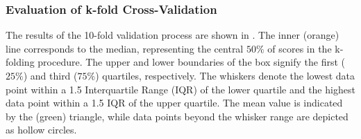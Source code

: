 \subsubsection{Evaluation of k-fold Cross-Validation}\label{sec:bbm_kfold_perf_eval}

The results of the 10-fold validation process are shown in . The inner (orange) line corresponds to the median, representing the central $50\%$ of scores in the k-folding procedure. The upper and lower boundaries of the box signify the first ($25\%$) and third ($75\%$) quartiles, respectively. The whiskers denote the lowest data point within a 1.5 Interquartile Range (IQR) of the lower quartile and the highest data point within a 1.5 IQR of the upper quartile. The mean value is indicated by the (green) triangle, while data points beyond the whisker range are depicted as hollow circles.\\

